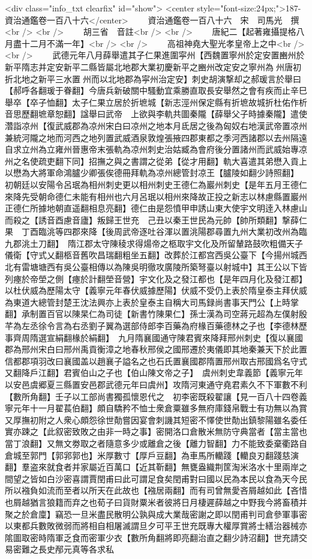 <div class="info_txt clearfix" id="show">
<center style="font-size:24px;">187-資治通鑑卷一百八十六</center>
  　　資治通鑑卷一百八十六　宋　司馬光　撰<br />
<br />
　　胡三省　音註<br />
<br />
　　唐紀二【起著雍攝提格八月盡十二月不滿一年】<br />
<br />
　　高祖神堯大聖光孝皇帝上之中<br />
<br />
　　武德元年八月薛舉遣其子仁果進圍寜州【西魏置寧州於定安置豳州於新平隋志并定安新平二縣皆屬北地郡大業初慶新平之豳州改定安之寧州為州唐初折北地之新平三水置州而以北地郡為寜州治定安】刺史胡演撃却之郝瑗言於舉曰【郝呼各翻瑗于眷翻】今唐兵新破關中騷動宜乘勝直取長安舉然之會有疾而止辛巳舉卒【卒子恤翻】太子仁果立居於折墌城【新志涇州保定縣有折墌故城折杜佑作析音思歷翻墌章恕翻】諡舉曰武帝　上欲與李軌共圖秦隴【薛舉父子時據秦隴】遣使濳詣凉州【復武威郡為凉州宋白曰凉州之地本月氐居之後為匈奴右地漢武帝置凉州兼統河隴之地而河西之地列置武威酒泉敦煌張掖四郡東都之季河西諸郡以去州隔遠自求立州為立雍州晉惠帝末張軌為凉州刺史治姑臧為會府後分置諸州而武威始專凉州之名使疏吏翻下同】招撫之與之書謂之從弟【從才用翻】軌大喜遣其弟懋入貢上以懋為大將軍命鴻臚少卿張俟德冊拜軌為凉州總管封凉王【臚陵如翻少詩照翻】　初朝廷以安陽令呂珉為相州刺史更以相州刺史王德仁為巖州刺史【是年五月王德仁來降先受朝命德仁未能有相州也六月呂珉以相州來降故正投之新志以林慮縣置巖州正德仁所據地朝直遥翻相息亮翻】德仁由是怨憤甲申誘山東大使宇文明逹入林慮山而殺之【誘音酉慮音廬】叛歸王世充　己丑以秦王世民為元帥【帥所類翻】撃薛仁果　丁酉臨洮等四郡來降【後周武帝逐吐谷渾以置洮陽郡尋置九州大業初改州為臨九郡洮土刀翻】　隋江郡太守陳稜求得煬帝之柩取宇文化及所留輦路鼓吹粗備天子儀衛【守式乂翻柩音舊吹昌瑞翻粗坐五翻】改葬於江都宫西吳公臺下【今揚州城西北有雷塘塘西有吳公臺相傳以為陳吳明徹攻廣陵所築弩臺以射城中】其王公以下皆列瘞於帝塋之側【瘞於計翻塋音營】宇文化及之發江都也【是年四月化及發江都】　以杜伏威為歷陽太守【義寧元年春伏威據歷陽】伏威不受仍上表於隋皇泰主拜伏威為東道大總管封楚王沈法興亦上表於皇泰主自稱大司馬録尚書事天門公【上時掌翻】承制置百官以陳杲仁為司徒【新書竹陳果仁】孫士漢為司空蔣元超為左僕射殷芊為左丞徐令言為右丞劉子翼為選部侍郎李百藥為府椽百藥德林之子也【李德林歷事齊周隋選宣絹翻椽於絹翻】　九月隋襄國通守陳君賓來降拜邢州刺史【復以襄國郡為邢州宋白曰邢州禹貢衡漳之地春秋邢侯之國邢遷於夷儀即其地秦兼天下於此置信都郡項羽改曰襄國盖以趙襄子謚名之也石氏置襄國郡隋置邢州取古邢國爲名守式又翻降戶江翻】君賓伯山之子也【伯山陳文帝之子】　虞州刺史韋義節【義寧元年以安邑虞郷夏三縣置安邑郡武德元年曰虞州】攻隋河東通守堯君素久不下軍數不利【數所角翻】壬子以工部尚書獨孤懷恩代之　初李密既殺翟讓【見一百八十四卷義寧元年十一月翟萇伯翻】頗自驕矜不恤士衆倉粟雖多無府庫錢帛戰士有功無以為賞又厚撫初附之人衆心頗怨徐世勣嘗因宴會刺譏其短密不懌使世勣出鎮黎陽雖名委任實亦踈之【此叙密致敗之由非一時之事】密開洛口倉散米無防守典當者【當主當也當丁浪翻】又無文劵取之者隨意多少或離倉之後【離力智翻】力不能致委棄衢路自倉城至郭門【郭郛郭也】米厚數寸【厚戶豆翻】為車馬所轥踐【轥良刃翻踐慈演翻】羣盗來就食者并家屬近百萬口【近其靳翻】無甕盎織荆筐淘米洛水十里兩岸之間望之皆如白沙密喜謂賈閏甫曰此可謂足食矣閏甫對曰國以民為本民以食為天今民所以襁負如流而至者以所天在此故也【襁居兩翻】而有司曾無愛吝屑越如此【吝惜也屑越猶言狼籍而弃之也荀子曰貨財粟米者彼將日月棲遲薛越之中野我今將畜積并聚之於倉廩】竊恐一旦米盡民散明公孰與成大業哉密謝之即以閏甫判司倉參軍事密以東都兵數敗微弱而將相自相屠滅謂旦夕可平王世充既專大權厚賞將士繕治器械亦隂圖取密時隋軍乏食而密軍少衣【數所角翻將即亮翻治直之翻少詩沼翻】世充請交易密難之長史邴元真等各求私